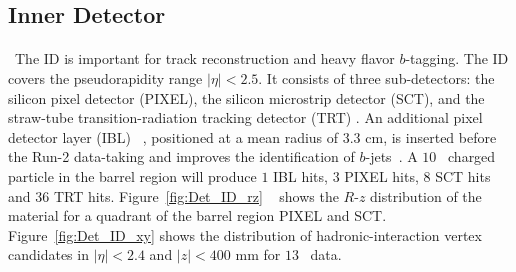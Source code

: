 \subsection{Inner Detector}
\paragraph{}\
The ID is important for track reconstruction and heavy flavor $b$-tagging. 
The ID covers the pseudorapidity range $|\eta| < 2.5$.
It consists of three sub-detectors: the silicon pixel detector (PIXEL), the silicon microstrip detector (SCT), and the straw-tube transition-radiation tracking detector (TRT) . 
An additional pixel detector layer (IBL) ~\cite{Capeans:1291633}, positioned at a mean radius of $3.3$ cm, is inserted before the Run-2 data-taking and improves the identification of $b$-jets~\cite{ATL-PHYS-PUB-2015-022}. 
A $10$\GeV~ charged particle in the barrel region will produce $1$ IBL hits, $3$ PIXEL hits, $8$ SCT hits and $36$ TRT hits.
Figure~\ref{fig:Det_ID_rz} ~\cite{Aaboud:2017pjd} shows the $R$-$z$ distribution of the material for a quadrant of the barrel region PIXEL and SCT. 
Figure~\ref{fig:Det_ID_xy} shows the distribution of hadronic-interaction vertex candidates in $|\eta|<2.4$ and $|z|<400$ mm for $13$\TeV~ data.


